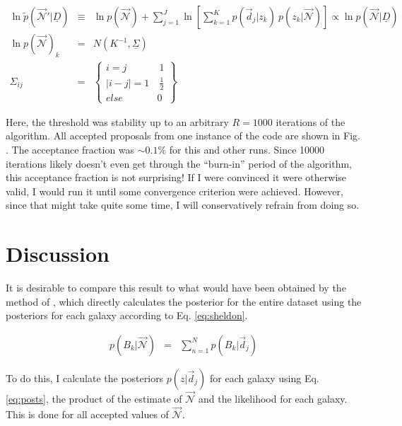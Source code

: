 \documentclass[12pt, onecolumn]{emulateapj}
\newcommand{\textul}{\underline}
\begin{document}
\begin{eqnarray}
\label{eq:disc-post}
\ln\tilde{p}(\vec{\mathcal{N}}'|\textul{D}) &\equiv& \ln p(\vec{\mathcal{N}}) + \sum_{j=1}^{J}\ln\left[\sum_{k=1}^{K}p(\vec{d}_{j}|z_{k})\ p(z_{k}|\vec{\mathcal{N}})\right] \propto \ln p(\vec{\mathcal{N}}|\textul{D})\\
\ln p(\vec{\mathcal{N}})_{k} &=& N(K^{-1},\textul{\Sigma})\nonumber\\
\Sigma_{ij} &=& \left\{\begin{array}{cc}i=j&\ 1\\|i-j|=1&\ \frac{1}{2}\\else&0\end{array}\right\}
\end{eqnarray}

Here, the threshold was stability up to an arbitrary $R=1000$ iterations of the algorithm.  All accepted proposals from one instance of the code are shown in Fig. %
.  The acceptance fraction was $\sim0.1\%$ for this and other runs.  Since 10000 iterations likely doesn't even get through the ``burn-in'' period of the algorithm, this acceptance fraction is not surprising!  If I were convinced it were otherwise valid, I would run it until some convergence criterion were achieved.  However, since that might take quite some time, I will conservatively refrain from doing so.


\section{Discussion}

It is desirable to compare this result to what would have been obtained by the method of \citet{she11}, which directly calculates the posterior for the entire dataset using the posteriors for each galaxy according to Eq. \ref{eq:sheldon}.

\begin{eqnarray}
\label{eq:sheldon}
p(B_{k}|\vec{\mathcal{N}}) &=& \sum_{n=1}^{N}p(B_{k}|\vec{d}_{j})
\end{eqnarray}

To do this, I calculate the posteriors $p(z|\vec{d}_{j})$ for each galaxy using Eq. \ref{eq:posts}, the product of the estimate of $\vec{\mathcal{N}}$ and the likelihood for each galaxy.  This is done for all accepted values of $\vec{\mathcal{N}}$.
\end{document}
